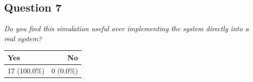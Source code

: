 \subsection{Question 7}\label{question1:7}
\emph{Do you find this simulation useful over implementing the system directly into a real system?}
\begin{table}[H]
	\begin{center}
		\small \begin{tabular*}{0.35\columnwidth}{lr}
			\\ \hline \hline
			Yes & No \\ \hline \hline

		 	17 (100.0\%) & 0 (0.0\%)\\ \hline
		\end{tabular*}
	\end{center}
\end{table}

